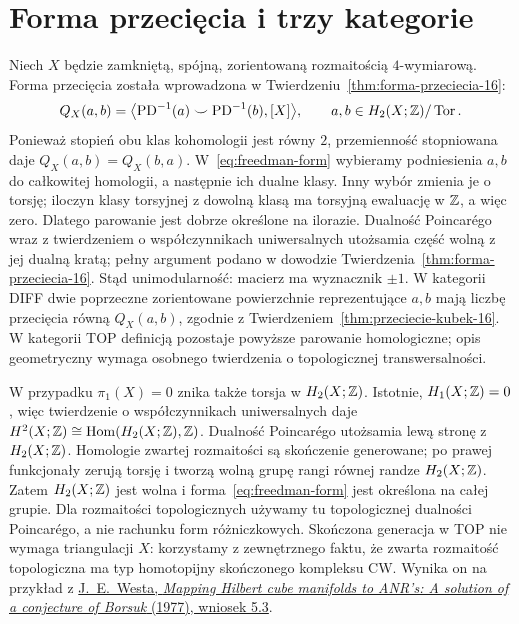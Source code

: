\section{Forma przecięcia i trzy kategorie}
\label{sec:freedman-form}

Niech $X$ będzie zamkniętą, spójną, zorientowaną
rozmaitością $4$-wymiarową. Forma przecięcia została
wprowadzona w Twierdzeniu~\ref{thm:forma-przeciecia-16}:
\begin{equation}\label{eq:freedman-form}
 Q_X(a,b)=\bigl\langle
  \operatorname{PD}^{-1}(a)\smile
  \operatorname{PD}^{-1}(b),[X]\bigr\rangle,
 \qquad a,b\in H_2(X;\mathbb{Z})/\operatorname{Tor}.
\end{equation}
Ponieważ stopień obu klas kohomologii jest równy $2$,
przemienność stopniowana daje $Q_X(a,b)=Q_X(b,a)$.
W~\eqref{eq:freedman-form} wybieramy podniesienia $a,b$
do całkowitej homologii, a następnie ich dualne klasy.
Inny wybór zmienia je o torsję; iloczyn klasy torsyjnej
z dowolną klasą ma torsyjną ewaluację w $\mathbb{Z}$, a więc zero.
Dlatego parowanie jest dobrze określone na ilorazie.
Dualność Poincarégo wraz z twierdzeniem o współczynnikach
uniwersalnych utożsamia część wolną z jej dualną kratą;
pełny argument podano w dowodzie
Twierdzenia~\ref{thm:forma-przeciecia-16}.
Stąd unimodularność: macierz ma wyznacznik $\pm1$.
W kategorii DIFF
dwie poprzeczne zorientowane powierzchnie reprezentujące
$a,b$ mają liczbę przecięcia równą $Q_X(a,b)$, zgodnie
z Twierdzeniem~\ref{thm:przeciecie-kubek-16}.
W kategorii TOP definicją pozostaje powyższe parowanie
homologiczne; opis geometryczny wymaga osobnego twierdzenia
o topologicznej transwersalności.

W przypadku $\pi_1(X)=0$ znika także torsja w $H_2(X;\mathbb{Z})$.
Istotnie, $H_1(X;\mathbb{Z})=0$, więc twierdzenie o współczynnikach
uniwersalnych daje
$H^2(X;\mathbb{Z})\cong\operatorname{Hom}(H_2(X;\mathbb{Z}),\mathbb{Z})$.
Dualność Poincarégo utożsamia lewą stronę z
$H_2(X;\mathbb{Z})$. Homologie zwartej rozmaitości są skończenie
generowane; po prawej funkcjonały zerują torsję i tworzą
wolną grupę rangi równej randze $H_2(X;\mathbb{Z})$. Zatem
$H_2(X;\mathbb{Z})$ jest wolna i forma~\eqref{eq:freedman-form}
jest określona na całej grupie. Dla rozmaitości
topologicznych używamy tu topologicznej dualności
Poincarégo, a nie rachunku form różniczkowych.
Skończona generacja w TOP nie wymaga triangulacji $X$:
korzystamy z zewnętrznego faktu, że zwarta rozmaitość
topologiczna ma typ homotopijny skończonego kompleksu CW.
Wynika on na przykład z
\href{https://webhomes.maths.ed.ac.uk/~v1ranick/papers/west.pdf}
{J.\ E.\ Westa, \emph{Mapping Hilbert cube manifolds to ANR's:
A solution of a conjecture of Borsuk} (1977), wniosek 5.3}.

